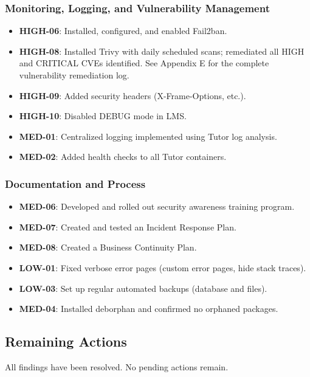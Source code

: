 \subsubsection{Monitoring, Logging, and Vulnerability Management}
\begin{itemize}
    \item \textbf{HIGH-06}: Installed, configured, and enabled Fail2ban.
    \item \textbf{HIGH-08}: Installed Trivy with daily scheduled scans; remediated all HIGH and CRITICAL CVEs identified. See Appendix E for the complete vulnerability remediation log.
    \item \textbf{HIGH-09}: Added security headers (X-Frame-Options, etc.).
    \item \textbf{HIGH-10}: Disabled DEBUG mode in LMS.
    \item \textbf{MED-01}: Centralized logging implemented using Tutor log analysis.
    \item \textbf{MED-02}: Added health checks to all Tutor containers.
\end{itemize}

\subsubsection{Documentation and Process}
\begin{itemize}
    \item \textbf{MED-06}: Developed and rolled out security awareness training program.
    \item \textbf{MED-07}: Created and tested an Incident Response Plan.
    \item \textbf{MED-08}: Created a Business Continuity Plan.
    \item \textbf{LOW-01}: Fixed verbose error pages (custom error pages, hide stack traces).
    \item \textbf{LOW-03}: Set up regular automated backups (database and files).
    \item \textbf{MED-04}: Installed deborphan and confirmed no orphaned packages.
\end{itemize}

\subsection{Remaining Actions}
All findings have been resolved. No pending actions remain.

